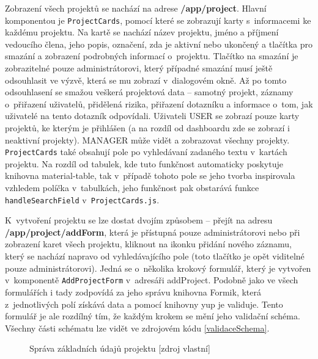 Zobrazení všech projektů se nachází na adrese \textbf{/app/project}. Hlavní komponentou je \texttt{ProjectCards}, pomocí které se zobrazují karty s~informacemi ke každému projektu. Na kartě se nachází název projektu, jméno a příjmení vedoucího člena, jeho popis, označení, zda je aktivní nebo ukončený a tlačítka pro smazání a zobrazení podrobných informací o~projektu. Tlačítko na smazání je zobrazitelné pouze administrátorovi, který případné smazání musí ještě odsouhlasit ve výzvě, která se mu zobrazí v~dialogovém okně. Až po tomto odsouhlasení se smažou veškerá projektová data – samotný projekt, záznamy o~přiřazení uživatelů, přidělená rizika, přiřazení dotazníku a informace o~tom, jak uživatelé na tento dotazník odpovídali. Uživateli USER se zobrazí pouze karty projektů, ke kterým je přihlášen (a na rozdíl od dashboardu zde se zobrazí i neaktivní projekty). MANAGER může vidět a zobrazovat všechny projekty. 
\texttt{ProjectCards} také obsahují pole po vyhledávaní zadaného textu v~kartách projektu. Na rozdíl od tabulek, kde tuto funkčnost automaticky poskytuje knihovna material-table, tak v~případě tohoto pole se jeho tvorba inspirovala vzhledem políčka v~tabulkách, jeho funkčnost pak obstarává  funkce \texttt{handleSearchField} v~\texttt{ProjectCards.js}.

K~vytvoření projektu se lze dostat dvojím způsobem – přejít na adresu \textbf{/app/project/addForm}, která je přístupná pouze administrátorovi nebo při zobrazení karet všech projektu, kliknout na ikonku přidání nového záznamu, který se nachází napravo od vyhledávajícího pole (toto tlačítko je opět viditelné pouze administrátorovi).  Jedná se o~několika krokový formulář, který je vytvořen v~komponentě \texttt{AddProjectForm} v~adresáři addProject. Podobně jako ve všech formulářích i tady zodpovídá za jeho správu knihovna Formik, která z~jednotlivých polí získává data a pomocí knihovny yup je validuje. Tento formulář je ale rozdílný tím, že každým krokem se mění jeho validační schéma. Všechny části schématu lze vidět ve zdrojovém kódu \ref{validaceSchema}. 

    \begin{figure}[ht]
    \begin{center}
    \caption{Správa základních údajů projektu [zdroj vlastní]}
    \label{projinfo}
    \end{center}
    \end{figure}


